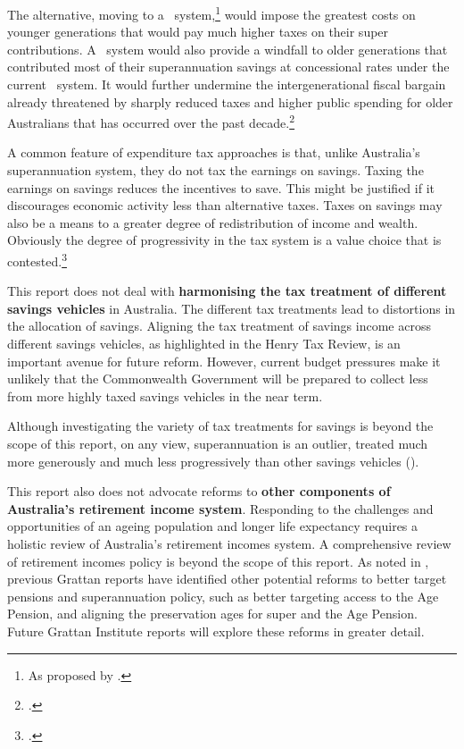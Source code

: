 The alternative, moving to a \TEE\ system,\footnote{As proposed by \textcites{MaddockKing2015}{Freebairn2015a}.} would impose the greatest costs on younger generations that would pay much higher taxes on their super contributions. A \TEE\ system would also provide a windfall to older generations that contributed most of their superannuation savings at concessional rates under the current \ttE\ system. It would further undermine the intergenerational fiscal bargain already threatened by sharply reduced taxes and higher public spending for older Australians that has occurred over the past decade.\footcite[][2]{DaleyWoodWeidmannEtAl2014} 

A common feature of expenditure tax approaches is that, unlike Australia’s superannuation system, they do not tax the earnings on savings. Taxing the earnings on savings reduces the incentives to save. This might be justified if it discourages economic activity less than alternative taxes. Taxes on savings may also be a means to a greater degree of redistribution of income and wealth. Obviously the degree of progressivity in the tax system is a value choice that is contested.\footcite{Davidson2015} 

This report does not deal with \textbf{harmonising the tax treatment of different savings vehicles} in Australia. The different tax treatments lead to distortions in the allocation of savings.  Aligning the tax treatment of savings income across different savings vehicles, as highlighted in the Henry Tax Review, is an important avenue for future reform. However, current budget pressures make it unlikely that the Commonwealth Government will be prepared to collect less from more highly taxed savings vehicles in the near term.

Although investigating the variety of tax treatments for savings is beyond the scope of this report, on any view, superannuation is an outlier, treated much more generously and much less progressively than other savings vehicles ().

This report also does not advocate reforms to \textbf{other components of Australia’s retirement income system}. Responding to the challenges and opportunities of an ageing population and longer life expectancy requires a holistic review of Australia’s retirement incomes system. A comprehensive review of retirement incomes policy is beyond the scope of this report. As noted in , previous Grattan reports have identified other potential reforms to better target pensions and superannuation policy, such as better targeting access to the Age Pension, and aligning the preservation ages for super and the Age Pension. Future Grattan Institute reports will explore these reforms in greater detail. 

